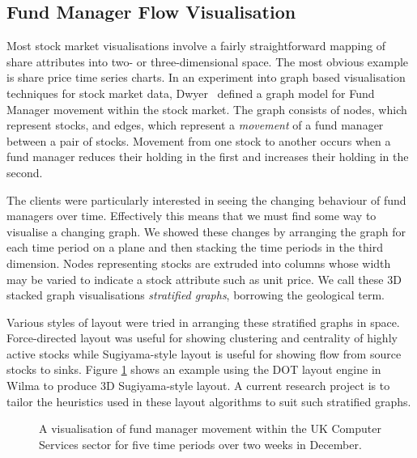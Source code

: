 \documentclass[runningheads]{cl2emult}
\begin{document}
\subsection{Fund Manager Flow Visualisation} \label{sec:fmflow}
Most stock market visualisations involve a fairly straightforward
mapping of share attributes into two- or three-dimensional space.  The most
obvious example is share price time series charts.  In an experiment
into graph based visualisation techniques for stock market data,
Dwyer~\cite{dwyer02fmflow} defined a graph model for Fund Manager
movement within the stock market.  The graph consists of nodes,
which represent stocks, and edges, which represent a {\em movement} of a
fund manager between a pair of stocks.  Movement from one stock to
another occurs when a fund manager reduces their holding in the first
and increases their holding in the second.

The clients were particularly interested in seeing the changing
behaviour of fund managers over time.  Effectively this means that we
must find some way to visualise a changing graph.  We showed these changes by
arranging the graph for each time period on a plane and then stacking
the time periods in the third dimension.  Nodes representing stocks
are extruded into columns whose width may be varied to indicate a
stock attribute such as unit price.  We call these 3D stacked graph
visualisations {\em stratified graphs}, borrowing the geological term.

Various styles of layout were tried in arranging these stratified
graphs in space.  Force-directed layout was useful for showing clustering and centrality of
highly active stocks while Sugiyama-style layout is useful for showing
flow from source stocks to sinks.  Figure \ref{fig-fm} shows an
example using the DOT layout engine in Wilma to produce 3D Sugiyama-style layout.  A current research project is to tailor the heuristics
used in these layout algorithms to suit such stratified graphs.

\begin{figure}[h]
  \centering
  \caption{A visualisation of fund manager movement within the UK
  Computer Services sector for five time periods over two weeks in December.}
  \label{fig-fm}
\end{figure}
\end{document}

